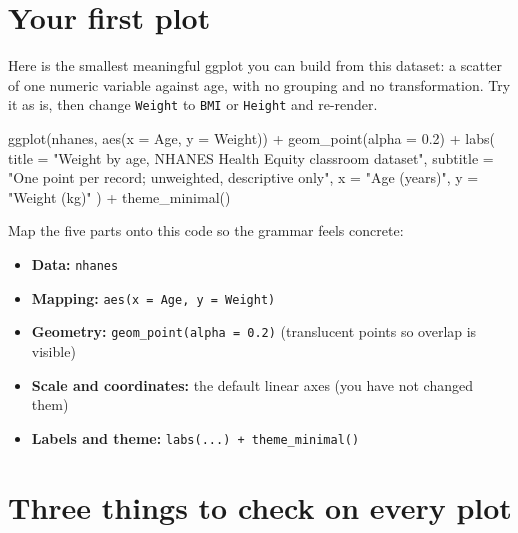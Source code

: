 \documentclass[
  letterpaper,
  DIV=11,
  numbers=noendperiod,
  oneside]{scrreprt}
\newenvironment{Shaded}{\begin{snugshade}}{\end{snugshade}}
\newcommand{\AttributeTok}[1]{\textcolor[rgb]{0.40,0.45,0.13}{#1}}
\newcommand{\FloatTok}[1]{\textcolor[rgb]{0.68,0.00,0.00}{#1}}
\newcommand{\FunctionTok}[1]{\textcolor[rgb]{0.28,0.35,0.67}{#1}}
\newcommand{\NormalTok}[1]{\textcolor[rgb]{0.00,0.23,0.31}{#1}}
\newcommand{\SpecialCharTok}[1]{\textcolor[rgb]{0.37,0.37,0.37}{#1}}
\newcommand{\StringTok}[1]{\textcolor[rgb]{0.13,0.47,0.30}{#1}}
\providecommand{\tightlist}{%
  \setlength{\itemsep}{0pt}\setlength{\parskip}{0pt}}
\begin{document}
\section*{Your first plot}\label{your-first-plot}


Here is the smallest meaningful ggplot you can build from this dataset:
a scatter of one numeric variable against age, with no grouping and no
transformation. Try it as is, then change \texttt{Weight} to
\texttt{BMI} or \texttt{Height} and re-render.

\begin{Shaded}
\begin{Highlighting}[numbers=left,,]
\FunctionTok{ggplot}\NormalTok{(nhanes, }\FunctionTok{aes}\NormalTok{(}\AttributeTok{x =}\NormalTok{ Age, }\AttributeTok{y =}\NormalTok{ Weight)) }\SpecialCharTok{+}
  \FunctionTok{geom\_point}\NormalTok{(}\AttributeTok{alpha =} \FloatTok{0.2}\NormalTok{) }\SpecialCharTok{+}
  \FunctionTok{labs}\NormalTok{(}
    \AttributeTok{title =} \StringTok{"Weight by age, NHANES Health Equity classroom dataset"}\NormalTok{,}
    \AttributeTok{subtitle =} \StringTok{"One point per record; unweighted, descriptive only"}\NormalTok{,}
    \AttributeTok{x =} \StringTok{"Age (years)"}\NormalTok{,}
    \AttributeTok{y =} \StringTok{"Weight (kg)"}
\NormalTok{  ) }\SpecialCharTok{+}
  \FunctionTok{theme\_minimal}\NormalTok{()}
\end{Highlighting}
\end{Shaded}

Map the five parts onto this code so the grammar feels concrete:

\begin{itemize}
\tightlist
\item
  \textbf{Data:} \texttt{nhanes}
\item
  \textbf{Mapping:} \texttt{aes(x\ =\ Age,\ y\ =\ Weight)}
\item
  \textbf{Geometry:} \texttt{geom\_point(alpha\ =\ 0.2)} (translucent
  points so overlap is visible)
\item
  \textbf{Scale and coordinates:} the default linear axes (you have not
  changed them)
\item
  \textbf{Labels and theme:} \texttt{labs(...)\ +\ theme\_minimal()}
\end{itemize}

\section*{Three things to check on every
plot}\label{three-things-to-check-on-every-plot}
\end{document}
